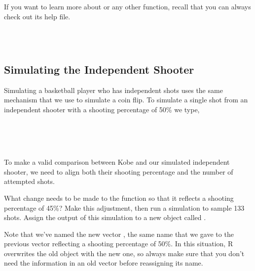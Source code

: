 \documentclass[11pt]{article}
\begin{document}
If you want to learn more about \texttt{} or any other function, recall that you can always check out its help file.

\ttfamily\noindent
\hlstd{}\hspace*{\fill}\\
\hlstd{}\hspace*{\fill}\\
\normalfont

%

\subsection*{Simulating the Independent Shooter}
Simulating a basketball player who has independent shots uses the same mechanism that we use to simulate a coin flip.  To simulate a single shot from an independent shooter with a shooting percentage of 50\% we type,

\ttfamily\noindent
\hlstd{}\hspace*{\fill}\\
\hlstd{}\hlassignement{\usebox{\hlnormalsizeboxlessthan}-}{\ }\hlkeyword{(}\hlkeyword{,}{\ }\hlkeyword{)}\hspace*{\fill}\\
\hlstd{}\hlassignement{\usebox{\hlnormalsizeboxlessthan}-}{\ }\hlkeyword{(}\hlkeyword{,}{\ }\hlargument{=}{\ }\hlkeyword{,}{\ }\hlargument{=}{\ }\hlkeyword{)}\hspace*{\fill}\\
\normalfont

To make a valid comparison between Kobe and our simulated independent shooter, we need to align both their shooting percentage and the number of attempted shots.

\begin{exercise}
What change needs to be made to the \texttt{} function so that it reflects a shooting percentage of 45\%?  Make this adjustment, then run a simulation to sample 133 shots.  Assign the output of this simulation to a new object called \texttt{}.
\end{exercise}

Note that we've named the new vector \texttt{}, the same name that we gave to the previous vector reflecting a shooting percentage of 50\%. In this situation, R overwrites the old object with the new one, so always make sure that you don't need the information in an old vector before reassigning its name.
\end{document}
